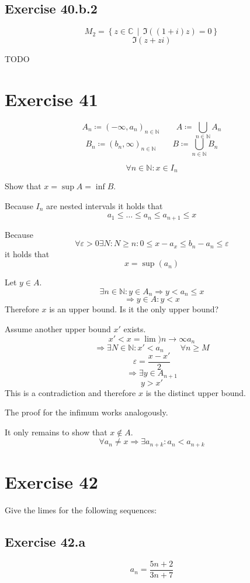 \documentclass[a4paper]{article}
\theoremstyle{definition}
\newcommand\setdef[2]{\left\{#1\,\middle|\,#2\right\}}
\begin{document}
\subsection{Exercise 40.b.2}
\[ M_2 = \setdef{z \in \mathbb C}{\Im((1 + i)z) = 0} \]
\[ \Im(z + zi) \]

TODO


\section{Exercise 41}

\[ A_n \coloneqq (-\infty, a_n)_{n \in \mathbb N} \qquad A \coloneqq \bigcup_{n \in \mathbb N} A_n \]
\[ B_n \coloneqq (b_n, \infty)_{n \in \mathbb N} \qquad B \coloneqq \bigcup_{n \in \mathbb N} B_n \]

\[ \forall n \in \mathbb N: x \in I_n \]

Show that $x = \sup{A} = \inf{B}$.

Because $I_n$ are nested intervals it holds that
\[ a_1 \leq \dots \leq a_n \leq a_{n+1} \leq x \]

Because
\[ \forall \varepsilon > 0 \exists N: N \geq n: 0 \leq x - a_x \leq b_n - a_n \leq \varepsilon \]
it holds that
\[ x = \sup(a_n) \]

Let $y \in A$.
\[ \exists n \in \mathbb N: y \in A_n \Rightarrow y < a_n \leq x \]
\[ \Rightarrow y \in A: y < x \]
Therefore $x$ is an upper bound. Is it the only upper bound?

Assume another upper bound $x'$ exists.
\[ x' < x = \lim){n\to\infty} a_n \]
\[ \Rightarrow \exists N \in \mathbb N: x' < a_n \qquad \forall n \geq M \]
\[ \varepsilon = \frac{x - x'}{2} \]
\[ \Rightarrow \exists y \in A_{n+1} \]
\[ y > x' \]
This is a contradiction and therefore $x$ is the distinct upper bound.

The proof for the infimum works analogously.

It only remains to show that $x \not\in A$.
\[ \forall a_n \neq x \Rightarrow \exists a_{n+k}: a_n < a_{n+k} \]

\section{Exercise 42}
Give the limes for the following sequences:

\subsection{Exercise 42.a}
\[ a_n = \frac{5n+2}{3n+7} \]
\end{document}
